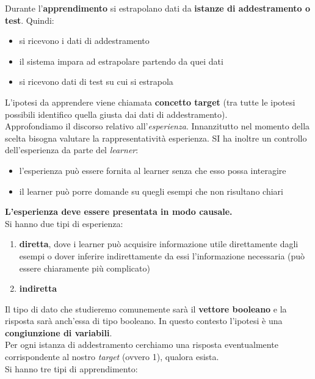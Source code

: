 \documentclass[a4paper,12pt, oneside]{book}
\begin{document}
Durante l'\textbf{apprendimento} si estrapolano dati da \textbf{istanze di
  addestramento o test}. Quindi:
\begin{itemize}
  \item si ricevono i dati di addestramento
  \item il sistema impara ad estrapolare partendo da quei dati
  \item si ricevono dati di test su cui si estrapola
\end{itemize}
L'ipotesi da apprendere viene chiamata \textbf{concetto target} (tra tutte le
ipotesi possibili identifico quella giusta dai dati di addestramento).\\
Approfondiamo il discorso relativo all'\textit{esperienza}. Innanzitutto nel
momento della scelta bisogna valutare la rappresentatività esperienza. SI ha
inoltre un controllo dell'esperienza da parte del \textit{learner}:
\begin{itemize}
  \item l'esperienza può essere fornita al learner senza che esso possa
  interagire
  \item il learner può porre domande su quegli esempi che non risultano chiari 
\end{itemize}
\textbf{L'esperienza deve essere presentata in modo causale.}\\
Si hanno due tipi di esperienza:
\begin{enumerate}
  \item \textbf{diretta}, dove i learner può acquisire informazione utile
  direttamente dagli esempi o dover inferire indirettamente da essi
  l’informazione necessaria (può essere chiaramente più complicato)
  \item \textbf{indiretta}
\end{enumerate}
Il tipo di dato che studieremo comunemente sarà il \textbf{vettore booleano} e
la risposta sarà anch'essa di tipo booleano. In questo contesto l'ipotesi è una
\textbf{congiunzione di variabili}.\\
Per ogni istanza di addestramento cerchiamo una risposta eventualmente
corrispondente al nostro \textit{target} (ovvero 1), qualora esista.\\
Si hanno tre tipi di apprendimento:
\end{document}
